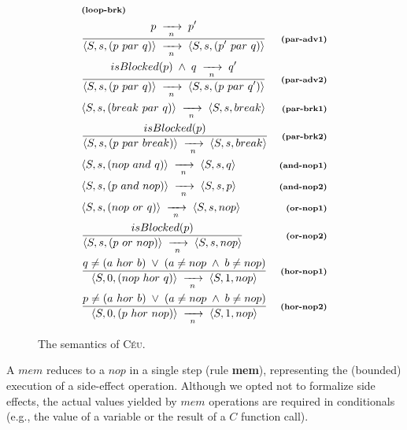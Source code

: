\documentclass{acm_proc_article-sp}
\newcommand{\CEU}{\textsc{C\'{e}u}\xspace}
\newcommand{\ST}{\1\xrightarrow[~n~]{}\1}
\newcommand{\LL}{\langle}
\newcommand{\RR}{\rangle}
\newcommand{\DS}{\displaystyle}
\newcommand{\rr}[1] {{\textbf{\scriptsize{#1}}}}
\newcommand{\1}{\;}
\newcommand{\2}{\;\;}
\newcommand{\3}{\;\;\;}
\newcommand{\5}{\;\;\;\;\;}
\begin{document}
\begin{figure}
{\begin{eqnarray*}
    & \rr{(loop-brk)}       \\
%
& \frac
    {\DS p \ST p' }
    {\DS \LL S,s, (p~par~q) \RR \ST \LL S,s, (p'~par~q) \RR }
    & \rr{(par-adv1)}      \\
& \frac
    {\DS isBlocked(p) \1\wedge\1 q \ST q' }
    {\DS \LL S,s, (p~par~q) \RR \ST \LL S,s, (p~par~q') \RR }
    & \rr{(par-adv2)}      \\
& \LL S,s, (break~par~q) \RR \ST \LL S,s, break \RR
    & \rr{(par-brk1)}   \\
& \frac
    {\DS isBlocked(p) }
    {\DS \LL S,s, (p~par~break) \RR \ST \LL S,s, break \RR }
    & \rr{(par-brk2)}       \\
& \LL S,s, (nop~and~q) \RR \ST \LL S,s, q \RR
    & \rr{(and-nop1)}   \\
& \LL S,s, (p~and~nop) \RR \ST \LL S,s, p \RR
    & \rr{(and-nop2)}   \\
%
%
& \LL S,s, (nop~or~q) \RR \ST \LL S,s, nop \RR
    & \rr{(or-nop1)}   \\
& \frac
    {\DS isBlocked(p) }
    {\DS \LL S,s, (p~or~nop) \RR \ST \LL S,s, nop \RR }
    & \rr{(or-nop2)}    \\
%
& \frac
    {\DS q \neq (a~hor~b) \1\vee\1 (a \neq nop \1\wedge\1 b \neq nop) }
    {\DS \LL S,0, (nop~hor~q) \RR \ST \LL S,1, nop \RR }
    & \rr{(hor-nop1)}   \\
& \frac
    {\DS p \neq (a~hor~b) \1\vee\1 (a \neq nop \1\wedge\1 b \neq nop) }
    {\DS \LL S,0, (p~hor~nop) \RR \ST \LL S,1, nop \RR }
    & \rr{(hor-nop2)}
%
\end{eqnarray*}
}
%
\caption{ The semantics of \CEU.
\label{fig.sem}
}
\end{figure}

A $mem$ reduces to a $nop$ in a single step (rule \rr{mem}), representing the 
(bounded) execution of a side-effect operation.
Although we opted not to formalize side effects, the actual values yielded by 
$mem$ operations are required in conditionals (e.g., the value of a variable or 
the result of a $C$ function call).
\end{document}
